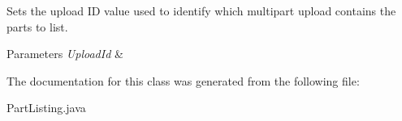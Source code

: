 Sets the upload ID value used to identify which multipart upload contains the parts to list. 


\begin{DoxyParams}{Parameters}
{\em Upload\+Id} & \\
\hline
\end{DoxyParams}


The documentation for this class was generated from the following file\+:\begin{DoxyCompactItemize}
\item 
Part\+Listing.\+java\end{DoxyCompactItemize}
